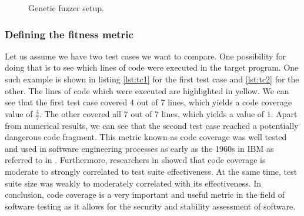 \begin{figure}[h!]
    \centering


    \caption{Genetic fuzzer setup.}
    \label{fig:genetic_fuzz}
\end{figure}

\subsubsection{Defining the fitness metric}
Let us assume we have two test cases we want to compare. One possibility for doing that is to see which lines of code were executed in the target program. One such example is shown in listing \ref{lst:tc1} for the first test case and \ref{lst:tc2} for the other. The lines of code which were executed are highlighted in yellow. We can see that the first test case covered 4 out of 7 lines, which yields a code coverage value of $\frac{4}{7}$. The other covered all 7 out of 7 lines, which yields a value of $1$. Apart from numerical results, we can see that the second test case reached a potentially dangerous code fragment. This metric known as code coverage was well tested and used in software engineering processes as early as the 1960s in IBM as referred to in \cite{ibm_coverage}. Furthermore, researchers in \cite{coverage} showed that code coverage is moderate to strongly correlated to test suite effectiveness. At the same time, test suite size was weakly to moderately correlated with its effectiveness. In conclusion, code coverage is a very important and useful metric in the field of software testing as it allows for the security and stability assessment of software.

